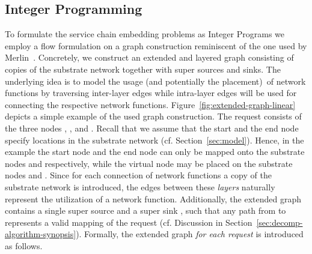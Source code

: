 \documentclass[10pt, conference, letterpaper]{IEEEtran}
\begin{document}
\subsection{Integer Programming}
\label{sec:integer-linear-program}

To formulate the service chain embedding problems as Integer Programs we employ a flow formulation on a graph construction reminiscent of the one used by Merlin~\cite{merlin}. Concretely, we construct an extended and layered graph consisting of copies of the substrate network together with super sources and sinks. The underlying idea is to model the usage (and potentially the placement)~of network functions by traversing inter-layer edges while intra-layer edges will be used for connecting the respective network functions. Figure~\ref{fig:extended-graph-linear} depicts a simple example of the used graph construction. The request  consists of the three nodes , , and . Recall that we assume that the start and the end node specify locations in the substrate network (cf. Section~\ref{sec:model}). Hence, in the example the start node  and the end node  can only be mapped onto the substrate nodes  and  respectively, while the virtual node  may be placed on the substrate nodes  and . Since for each connection of network functions a copy of the substrate network is introduced, the edges between these \emph{layers} naturally represent the utilization of a network function.
Additionally, the extended graph  contains a single super source  and a super sink , such that any path from  to  represents a valid mapping of the request (cf. Discussion in Section~\ref{sec:decomp-algorithm-synopsis}). Formally, the extended graph \emph{for each request}  is introduced as follows.
\end{document}
